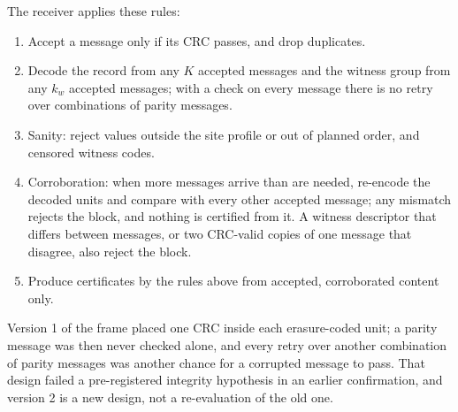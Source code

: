 The receiver applies these rules:
\begin{enumerate}
  \item Accept a message only if its CRC passes, and drop duplicates.
  \item Decode the record from any $K$ accepted messages and the witness group from any $k_w$ accepted messages; with a check on every message there is no retry over combinations of parity messages.
  \item Sanity: reject values outside the site profile or out of planned order, and censored witness codes.
  \item Corroboration: when more messages arrive than are needed, re-encode the decoded units and compare with every other accepted message; any mismatch rejects the block, and nothing is certified from it. A witness descriptor that differs between messages, or two CRC-valid copies of one message that disagree, also reject the block.
  \item Produce certificates by the rules above from accepted, corroborated content only.
\end{enumerate}
Version 1 of the frame placed one CRC inside each erasure-coded unit; a parity message was then never checked alone, and every retry over another combination of parity messages was another chance for a corrupted message to pass. That design failed a pre-registered integrity hypothesis in an earlier confirmation, and version 2 is a new design, not a re-evaluation of the old one.

